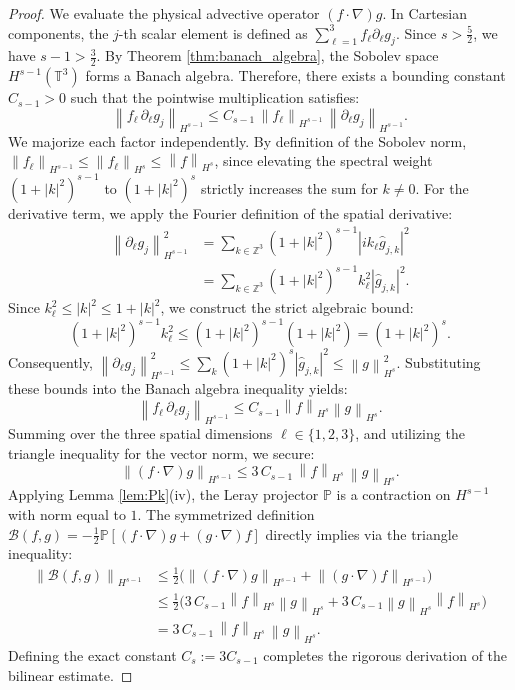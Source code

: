 \documentclass[12pt,a4paper]{article}
\theoremstyle{plain}
\theoremstyle{definition}
\theoremstyle{remark}
\newcommand{\T}{\mathbb{T}}
\newcommand{\Z}{\mathbb{Z}}
\newcommand{\norm}[1]{\left\|#1\right\|}
\newcommand{\abs}[1]{\left|#1\right|}
\newcommand{\grad}{\nabla}
\newcommand{\BB}{\mathcal{B}}
\newcommand{\PP}{\mathbb{P}}
\begin{document}
\begin{proof}
We evaluate the physical advective operator $(f \cdot \grad)g$. In Cartesian components, the $j$-th scalar element is defined as $\sum_{\ell=1}^3 f_\ell \partial_\ell g_j$.
Since $s > \frac{5}{2}$, we have $s-1 > \frac{3}{2}$. By Theorem \ref{thm:banach_algebra}, the Sobolev space $H^{s-1}(\T^3)$ forms a Banach algebra. Therefore, there exists a bounding constant $C_{s-1} > 0$ such that the pointwise multiplication satisfies:
\[
  \norm{f_\ell\,\partial_\ell g_j}_{H^{s-1}} \le C_{s-1}\,\norm{f_\ell}_{H^{s-1}}\,\norm{\partial_\ell g_j}_{H^{s-1}}.
\]
We majorize each factor independently. By definition of the Sobolev norm, $\norm{f_\ell}_{H^{s-1}} \le \norm{f_\ell}_{H^s} \le \norm{f}_{H^s}$, since elevating the spectral weight $(1+|k|^2)^{s-1}$ to $(1+|k|^2)^s$ strictly increases the sum for $k \neq 0$.
For the derivative term, we apply the Fourier definition of the spatial derivative:
\begin{align*}
  \norm{\partial_\ell g_j}_{H^{s-1}}^2
  &= \sum_{k\in\Z^3} (1+|k|^2)^{s-1} \abs{i k_\ell \hat{g}_{j,k}}^2 \\
  &= \sum_{k\in\Z^3} (1+|k|^2)^{s-1} k_\ell^2 \abs{\hat{g}_{j,k}}^2.
\end{align*}
Since $k_\ell^2 \le |k|^2 \le 1 + |k|^2$, we construct the strict algebraic bound:
\[
  (1+|k|^2)^{s-1} k_\ell^2 \le (1+|k|^2)^{s-1} (1+|k|^2) = (1+|k|^2)^s.
\]
Consequently, $\norm{\partial_\ell g_j}_{H^{s-1}}^2 \le \sum_{k} (1+|k|^2)^s \abs{\hat{g}_{j,k}}^2 \le \norm{g}_{H^s}^2$. 
Substituting these bounds into the Banach algebra inequality yields:
\[
  \norm{f_\ell\,\partial_\ell g_j}_{H^{s-1}} \le C_{s-1} \norm{f}_{H^s} \norm{g}_{H^s}.
\]
Summing over the three spatial dimensions $\ell \in \{1, 2, 3\}$, and utilizing the triangle inequality for the vector norm, we secure:
\[
  \norm{(f\cdot\grad)g}_{H^{s-1}} \le 3\,C_{s-1}\,\norm{f}_{H^s}\,\norm{g}_{H^s}.
\]
Applying Lemma \ref{lem:Pk}(iv), the Leray projector $\PP$ is a contraction on $H^{s-1}$ with norm equal to $1$. The symmetrized definition $\BB(f,g) = -\frac{1}{2}\PP[(f\cdot\grad)g + (g\cdot\grad)f]$ directly implies via the triangle inequality:
\begin{align*}
  \norm{\BB(f,g)}_{H^{s-1}}
  &\le \frac{1}{2}\Big( \norm{(f\cdot\grad)g}_{H^{s-1}} + \norm{(g\cdot\grad)f}_{H^{s-1}} \Big) \\
  &\le \frac{1}{2}\Big( 3\,C_{s-1}\norm{f}_{H^s}\norm{g}_{H^s} + 3\,C_{s-1}\norm{g}_{H^s}\norm{f}_{H^s} \Big) \\
  &= 3\,C_{s-1}\,\norm{f}_{H^s}\,\norm{g}_{H^s}.
\end{align*}
Defining the exact constant $C_s := 3 C_{s-1}$ completes the rigorous derivation of the bilinear estimate.
\end{proof}
\end{document}
